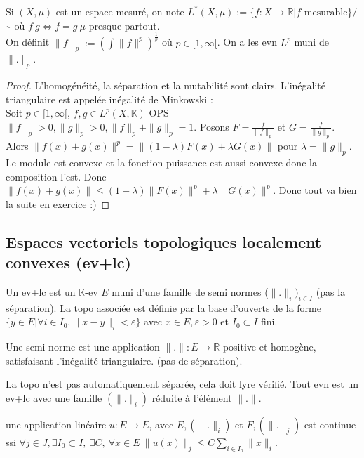 Si $(X,\mu)$ est un espace mesuré, on note $L^*(X,\mu):=\{f:X\to \mathbb{R} |f \text{ mesurable}\} /$\~{} où $f~g\Leftrightarrow f=g\ \mu$-presque partout.\\

On définit $\|f\|_p:=\left( \int\|f\|^p \right)^{\frac{1}{p}}$ où $p\in [1,\infty [$. On a les evn $L^p$ muni de $\|.\|_p$.\\
\begin{proof}
    L'homogénéité, la séparation et la mutabilité sont clairs. L'inégalité triangulaire est appelée inégalité de Minkowski :\\
    Soit $p\in [1,\infty [$, $f,g\in L^p(X,\mathbb{K})$ OPS $\|f\|_p>0,\|g\|_p>0, \|f\|_p+\|g\|_p=1$. Posons $F=\frac{f}{\|f\|_p}$ et $G=\frac{f}{\|g\|_p}$. \\
    Alors $\|f(x)+g(x)\|^p=\|(1-\lambda)F(x)+\lambda G(x)\|$ pour $\lambda=\|g\|_p$. Le module est convexe et la fonction puissance est aussi convexe donc la composition l'est. Donc $\|f(x)+g(x)\|\le (1-\lambda)\|F(x)\|^p+\lambda\|G(x)\|^p$. Donc tout va bien la suite en exercice :)
\end{proof}


\subsection{Espaces vectoriels topologiques localement convexes (ev+lc)}

\begin{definition}
    Un ev+lc est un $\mathbb{K}$-ev $E$ muni d'une famille de semi normes ($\|.\|_i)_{i\in I}$ (pas la séparation). La topo associée est définie par la base d'ouverts de la forme $\{y\in E| \forall i\in I_0, \|x-y\|_i<\varepsilon \} $ avec $x\in E, \varepsilon >0$ et $I_0\subset I$ fini.
\end{definition}

\begin{remarque}
    Une semi norme est une application $\|.\|:E\to \mathbb{R} $ positive et homogène, satisfaisant l'inégalité triangulaire. (pas de séparation).
\end{remarque}

\begin{remarque}
    La topo n'est pas automatiquement séparée, cela doit lyre vérifié. Tout evn est un ev+lc avec une famille $(\|.\|_i)$ réduite à l'élément $\|.\|$.
\end{remarque}

\begin{proposition}
   une application linéaire $u:E\to E$, avec $E, (\|.\|_i)$ et $F,(\|.\|_j)$ est continue ssi $\forall j\in J, \exists I_0\subset I,\ \exists C,\ \forall x\in E\ \|u(x)\|_j\le C \sum\limits_{i\in I_0}^{} \|x\|_i$. \\
\end{proposition}

